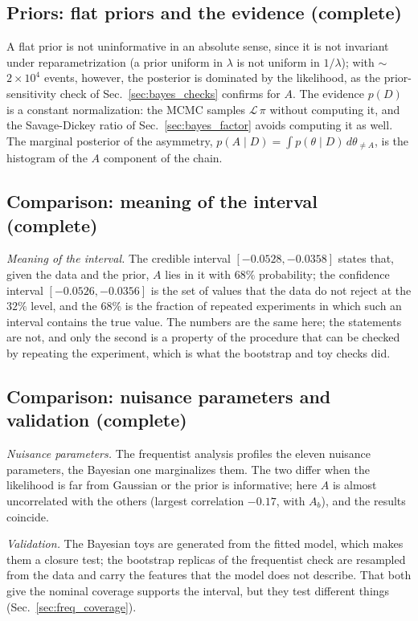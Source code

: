 \subsection{Priors: flat priors and the evidence (complete)}
A flat prior is not uninformative in an absolute sense, since it is not invariant under reparametrization (a prior uniform in $\lambda$ is not uniform in $1/\lambda$); with $\sim$$2\times10^4$ events, however, the posterior is dominated by the likelihood, as the prior-sensitivity check of Sec.~\ref{sec:bayes_checks} confirms for $A$. The evidence $p(D)$ is a constant normalization: the MCMC samples $\mathcal{L}\,\pi$ without computing it, and the Savage-Dickey ratio of Sec.~\ref{sec:bayes_factor} avoids computing it as well. The marginal posterior of the asymmetry, $p(A\mid D)=\int p(\theta\mid D)\,d\theta_{\neq A}$, is the histogram of the $A$ component of the chain.

\subsection{Comparison: meaning of the interval (complete)}
\emph{Meaning of the interval.} The credible interval $[-0.0528,-0.0358]$ states that, given the data and the prior, $A$ lies in it with $68\%$ probability; the confidence interval $[-0.0526,-0.0356]$ is the set of values that the data do not reject at the $32\%$ level, and the $68\%$ is the fraction of repeated experiments in which such an interval contains the true value. The numbers are the same here; the statements are not, and only the second is a property of the procedure that can be checked by repeating the experiment, which is what the bootstrap and toy checks did.

\subsection{Comparison: nuisance parameters and validation (complete)}
\emph{Nuisance parameters.} The frequentist analysis profiles the eleven nuisance parameters, the Bayesian one marginalizes them. The two differ when the likelihood is far from Gaussian or the prior is informative; here $A$ is almost uncorrelated with the others (largest correlation $-0.17$, with $A_b$), and the results coincide.

\emph{Validation.} The Bayesian toys are generated from the fitted model, which makes them a closure test; the bootstrap replicas of the frequentist check are resampled from the data and carry the features that the model does not describe. That both give the nominal coverage supports the interval, but they test different things (Sec.~\ref{sec:freq_coverage}).

